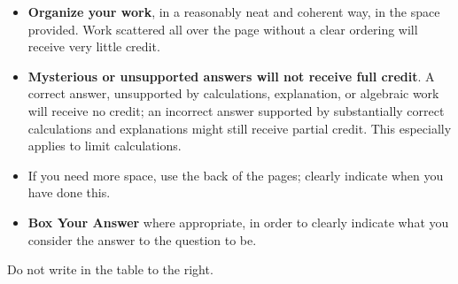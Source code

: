 \documentclass[11pt]{exam}
\theoremstyle{definition}
\begin{document}
\begin{minipage}[t]{3.7in}
\vspace{0pt}
\begin{itemize}


\item \textbf{Organize your work}, in a reasonably neat and coherent way, in
the space provided. Work scattered all over the page without a clear ordering will 
receive very little credit.  

\item \textbf{Mysterious or unsupported answers will not receive full
credit}.  A correct answer, unsupported by calculations, explanation,
or algebraic work will receive no credit; an incorrect answer supported
by substantially correct calculations and explanations might still receive
partial credit.  This especially applies to limit calculations.

\item If you need more space, use the back of the pages; clearly indicate when you have done this.

\item \textbf{Box Your Answer} where appropriate, in order to clearly indicate what you consider the answer to the question to be.
\end{itemize}

Do not write in the table to the right.
\end{minipage}
\hfill
\begin{minipage}[t]{2.3in}
\vspace{0pt}
\addpoints %
\gradetable[v]%

\end{minipage}
\newpage %

%
%
%
\end{document}
